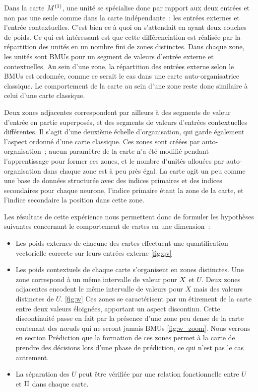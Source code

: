 \documentclass[../main]{subfiles}
\begin{document}
Dans la carte $M^{({1})}$, une unité se spécialise donc par rapport aux deux entrées et non pas une seule comme dans la carte indépendante~: les entrées externes et l'entrée contextuelles. C'est bien ce à quoi on s'attendait en ayant deux couches de poids. Ce qui est intéressant est que cette différenciation est réalisée par la répartition des unités en un nombre fini de zones distinctes. Dans chaque zone, les unités sont BMUs pour un segment de valeurs d'entrée externe et contextuelles. Au sein d'une zone, la répartition des entrées externe selon le BMUs est ordonnée, comme ce serait le cas dans une carte auto-organisatrice classique. Le comportement de la carte au sein d'une zone reste donc similaire à celui d'une carte classique.

Deux zones adjacentes correspondent par ailleurs à des segments de valeur d'entrée en partie superposés, et des segments de valeurs d'entrées contextuelles différentes. Il s'agit d'une deuxième échelle d'organisation, qui garde également l'aspect ordonné d'une carte classique. Ces zones sont créées par auto-organisation~; aucun paramètre de la carte n'a été modifié pendant l'apprentissage pour former ces zones, et le nombre d'unités allouées par auto-organisation dans chaque zone est à peu près égal. La carte agit un peu comme une base de données structurée avec des indices primaires et des indices secondaires pour chaque neurone, l'indice primaire étant la zone de la carte, et l'indice secondaire la position dans cette zone.

Les résultats de cette expérience nous permettent donc de formuler les hypothèses suivantes concernant le comportement de cartes en une dimension~:

\begin{itemize}
	\item Les poids externes de chacune des cartes effectuent une quantification vectorielle correcte sur leurs entrées externe \ref{fig:qv}
	\item Les poids contextuels de chaque carte s'organisent en zones distinctes. Une zone correspond à un même intervalle de valeur pour $X$ et $U$. Deux zones adjacentes encodent le même intervalle de valeurs pour $X$ mais des valeurs distinctes de $U$. \ref{fig:w} Ces zones se caractérisent par un étirement de la carte entre deux valeurs éloignées, apportant un aspect discontinu. Cette discontinuité passe en fait par la présence d'une zone peu dense de la carte contenant des n\oe{}uds qui ne seront jamais BMUs \ref{fig:w_zoom}. Nous verrons en section Prédiction que la formation de ces zones permet à la carte de prendre des décisions lors d'une phase de prédiction, ce qui n'est pas le cas autrement.
	\item La séparation des $U$ peut être vérifiée par une relation fonctionnelle entre $U$ et $\Pi$ dans chaque carte.
\end{itemize}
\end{document}
